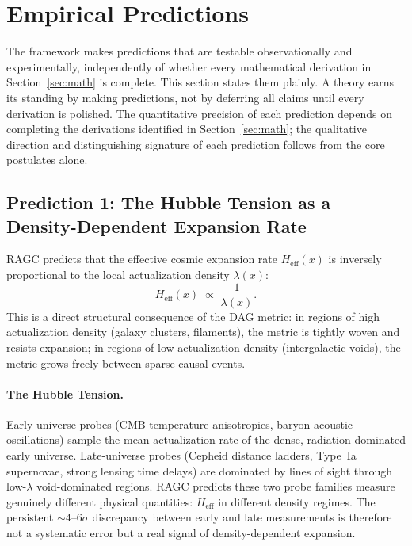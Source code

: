 \documentclass[11pt,a4paper]{article}
\theoremstyle{plain}
\theoremstyle{definition}
\theoremstyle{remark}
\begin{document}
\section{Empirical Predictions}
\label{sec:predictions}

The framework makes predictions that are testable observationally and experimentally,
independently of whether every mathematical derivation in Section~\ref{sec:math}
is complete. This section states them plainly. A theory earns its standing by
making predictions, not by deferring all claims until every derivation is polished.
The quantitative precision of each prediction depends on completing the derivations
identified in Section~\ref{sec:math}; the qualitative direction and distinguishing
signature of each prediction follows from the core postulates alone.

\subsection{Prediction 1: The Hubble Tension as a Density-Dependent Expansion Rate}

RAGC predicts that the effective cosmic expansion rate $H_{\mathrm{eff}}(x)$ is
inversely proportional to the local actualization density $\lambda(x)$:
\begin{equation}
  H_{\mathrm{eff}}(x) \;\propto\; \frac{1}{\lambda(x)}.
  \label{eq:hubble_pred}
\end{equation}
This is a direct structural consequence of the DAG metric: in regions of high
actualization density (galaxy clusters, filaments), the metric is tightly woven
and resists expansion; in regions of low actualization density (intergalactic
voids), the metric grows freely between sparse causal events.

\paragraph{The Hubble Tension.}
Early-universe probes (CMB temperature anisotropies, baryon acoustic oscillations)
sample the mean actualization rate of the dense, radiation-dominated early universe.
Late-universe probes (Cepheid distance ladders, Type~Ia supernovae, strong lensing
time delays) are dominated by lines of sight through low-$\lambda$ void-dominated
regions. RAGC predicts these two probe families measure genuinely different physical
quantities: $H_{\mathrm{eff}}$ in different density regimes. The persistent
$\sim\!4$--$6\sigma$ discrepancy between early and late measurements is therefore
not a systematic error but a real signal of density-dependent expansion.
\end{document}
